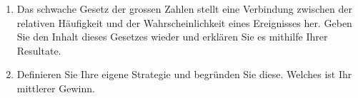 \documentclass[12pt,a4paper]{article}
\begin{document}
\begin{enumerate}
\item Das schwache Gesetz der grossen Zahlen stellt eine Verbindung zwischen der relativen Häufigkeit und der Wahrscheinlichkeit eines Ereignisses her. Geben Sie den Inhalt dieses Gesetzes wieder und erklären Sie es mithilfe Ihrer Resultate.
\item Definieren Sie Ihre eigene Strategie und begründen Sie diese. Welches ist Ihr mittlerer Gewinn.

\end{enumerate}
\end{document}
